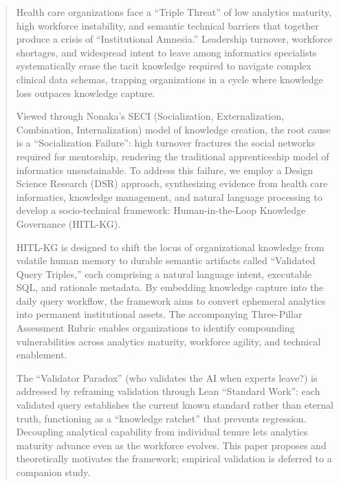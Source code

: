 \documentclass[
  american,
  11pt,
  letterpaper,
  oneside  ,captions=tableheading
]{scrartcl}
\begin{document}
\begin{abstract}
Health care organizations face a ``Triple Threat'' of low analytics
maturity, high workforce instability, and semantic technical barriers
that together produce a crisis of ``Institutional Amnesia.'' Leadership
turnover, workforce shortages, and widespread intent to leave among
informatics specialists systematically erase the tacit knowledge
required to navigate complex clinical data schemas, trapping
organizations in a cycle where knowledge loss outpaces knowledge
capture.

Viewed through Nonaka's SECI (Socialization, Externalization,
Combination, Internalization) model of knowledge creation, the root
cause is a ``Socialization Failure'': high turnover fractures the social
networks required for mentorship, rendering the traditional
apprenticeship model of informatics unsustainable. To address this
failure, we employ a Design Science Research (DSR) approach,
synthesizing evidence from health care informatics, knowledge
management, and natural language processing to develop a socio-technical
framework: Human-in-the-Loop Knowledge Governance (HITL-KG).

HITL-KG is designed to shift the locus of organizational knowledge from
volatile human memory to durable semantic artifacts called ``Validated
Query Triples,'' each comprising a natural language intent, executable
SQL, and rationale metadata. By embedding knowledge capture into the
daily query workflow, the framework aims to convert ephemeral analytics
into permanent institutional assets. The accompanying Three-Pillar
Assessment Rubric enables organizations to identify compounding
vulnerabilities across analytics maturity, workforce agility, and
technical enablement.

The ``Validator Paradox'' (who validates the AI when experts leave?) is
addressed by reframing validation through Lean ``Standard Work'': each
validated query establishes the current known standard rather than
eternal truth, functioning as a ``knowledge ratchet'' that prevents
regression. Decoupling analytical capability from individual tenure lets
analytics maturity advance even as the workforce evolves. This paper
proposes and theoretically motivates the framework; empirical validation
is deferred to a companion study.
\end{abstract}
\end{document}
